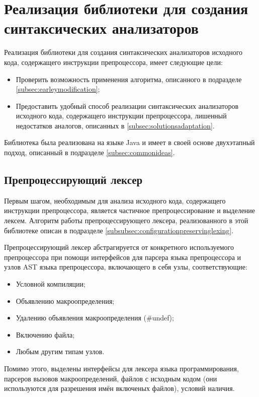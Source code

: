 \clearpage

\section{Реализация библиотеки для создания синтаксических анализаторов}

Реализация библиотеки для создания синтаксических анализаторов исходного кода, содержащего инструкции препроцессора, имеет следующие цели:

\begin{itemize}
\item Проверить возможность применения алгоритма, описанного в подразделе \ref{subsec:earleymodification};
\item Предоставить удобный способ реализации синтаксических анализаторов исходного кода, содержащего инструкции препроцессора, лишенный недостатков аналогов, описанных в \ref{subsec:solutionsadaptation}.
\end{itemize}

Библиотека была реализована на языке Java и имеет в своей основе двухэтапный подход, описанный в подразделе \ref{subsec:commonideas}. 

\subsection{Препроцессирующий лексер}

Первым шагом, необходимым для анализа исходного кода, содержащего инструкции препроцессора, является частичное препроцессирование и выделение лексем. Алгоритм работы препроцессирующего лексера, реализованного в этой библиотеке описан в подразделе \ref{subsubsec:configurationpreservinglexing}.

Препроцессирующий лексер абстрагируется от конкретного используемого препроцессора при помощи интерфейсов для парсера языка препроцессора и узлов AST языка препроцессора, включающего в себя узлы, соответствующие:

\begin{itemize}
\item Условной компиляции;
\item Объявлению макроопределения;
\item Удалению объявления макроопределения (\#undef);
\item Включению файла;
\item Любым другим типам узлов.
\end{itemize}

Помимо этого, выделены интерфейсы для лексера языка программирования, парсеров вызовов макроопределений, файлов с исходным кодом (они используются для разрешения имён включеных файлов), условий наличия.

